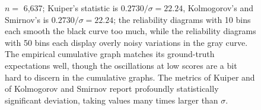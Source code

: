 \documentclass{article}
\begin{document}
\begin{figure}
\begin{centering}
\end{centering}
\caption{$n =$ 6,637; Kuiper's statistic is $0.2730 / \sigma = 22.24$,
         Kolmogorov's and Smirnov's is $0.2730 / \sigma = 22.24$;
         the reliability diagrams with 10 bins each smooth the black curve
         too much, while the reliability diagrams with 50 bins each display
         overly noisy variations in the gray curve.
         The empirical cumulative graph matches its ground-truth expectations
         well, though the oscillations at low scores are a bit hard to discern
         in the cumulative graphs.
         The metrics of Kuiper and of Kolmogorov and Smirnov
         report profoundly statistically significant deviation,
         taking values many times larger than $\sigma$.
}
\label{ex2}
\end{figure}
\end{document}
